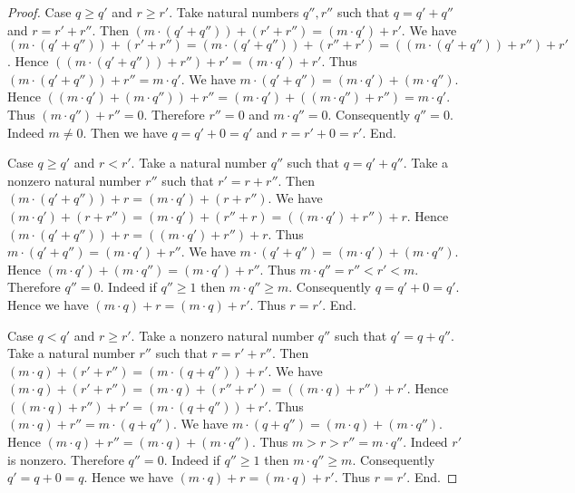 \documentclass[../../arithmetic.tex]{subfiles}
\begin{document}
\begin{forthel}
\begin{proof}
      Case $q \geq q'$ and $r \geq r'$.
        Take natural numbers $q'',r''$ such that $q = q' + q''$ and $r = r' + r''$.
        Then $(m \cdot (q' + q'')) + (r' + r'') = (m \cdot q') + r'$.
        We have $(m \cdot (q' + q'')) + (r' + r'') = (m \cdot (q' + q'')) + (r'' + r') = ((m \cdot (q' + q'')) + r'') + r'$.
        Hence $((m \cdot (q' + q'')) + r'') + r' = (m \cdot q') + r'$.
        Thus $(m \cdot (q' + q'')) + r'' = m \cdot q'$.
        We have $m \cdot (q' + q'') = (m \cdot q') + (m \cdot q'')$.
        Hence $((m \cdot q') + (m \cdot q'')) + r'' = (m \cdot q') + ((m \cdot q'') + r'') = m \cdot q'$.
        Thus $(m \cdot q'') + r'' = 0$.
        Therefore $r'' = 0$ and $m \cdot q'' = 0$.
        Consequently $q'' = 0$.
        Indeed $m \neq 0$.
        Then we have $q = q' + 0 = q'$  and $r = r' + 0 = r'$.
      End.

      Case $q \geq q'$ and $r < r'$.
        Take a natural number $q''$ such that $q = q' + q''$.
        Take a nonzero natural number $r''$ such that $r' = r + r''$.
        Then $(m \cdot (q' + q'')) + r = (m \cdot q') + (r + r'')$.
        We have $(m \cdot q') + (r + r'') = (m \cdot q') + (r'' + r) = ((m \cdot q') + r'') + r$.
        Hence $(m \cdot (q' + q'')) + r = ((m \cdot q') + r'') + r$.
        Thus $m \cdot (q' + q'') = (m \cdot q') + r''$.
        We have $m \cdot (q' + q'') = (m \cdot q') + (m \cdot q'')$.
        Hence $(m \cdot q') + (m \cdot q'') = (m \cdot q') + r''$.
        Thus $m \cdot q'' = r'' < r' < m$.
        Therefore $q'' = 0$.
        Indeed if $q'' \geq 1$ then $m \cdot q'' \geq m$.
        Consequently $q = q' + 0 = q'$.
        Hence we have $(m \cdot q) + r = (m \cdot q) + r'$.
        Thus $r = r'$.
      End.

      Case $q < q'$ and $r \geq r'$.
        Take a nonzero natural number $q''$ such that $q' = q + q''$.
        Take a natural number $r''$ such that $r = r' + r''$.
        Then $(m \cdot q) + (r' + r'') = (m \cdot (q + q'')) + r'$.
        We have $(m \cdot q) + (r' + r'') = (m \cdot q) + (r'' + r') = ((m \cdot q) + r'') + r'$.
        Hence $((m \cdot q) + r'') + r' = (m \cdot (q + q'')) + r'$.
        Thus $(m \cdot q) + r'' = m \cdot (q + q'')$.
        We have $m \cdot (q + q'') = (m \cdot q) + (m \cdot q'')$.
        Hence $(m \cdot q) + r'' = (m \cdot q) + (m \cdot q'')$.
        Thus $m > r > r'' = m \cdot q''$.
        Indeed $r'$ is nonzero.
        Therefore $q'' = 0$.
        Indeed if $q'' \geq 1$ then $m \cdot q'' \geq m$.
        Consequently $q' = q + 0 = q$.
        Hence we have $(m \cdot q) + r = (m \cdot q) + r'$.
        Thus $r = r'$.
      End.


\end{proof}
\end{forthel}
\end{document}

